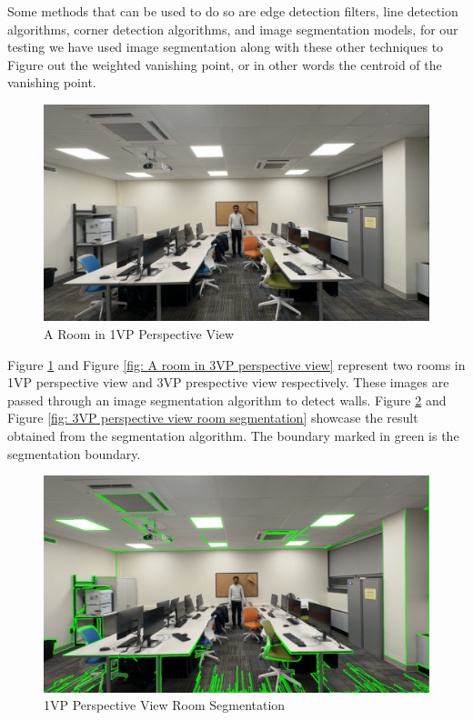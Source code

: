 \documentclass[12pt]{report}
\begin{document}
Some methods that can be used to do so are edge detection filters, line detection algorithms, corner detection algorithms, and image segmentation models, for our testing we have used image segmentation along with these other techniques to Figure out the weighted vanishing point, or in other words the centroid of the vanishing point.\newline

\begin{figure}[H]
    \centering
    \includegraphics[width=1.0\textwidth]{1vp room.jpg}
    \caption{A Room in 1VP Perspective View}
    \label{fig: A room in 1VP perspective view}
\end{figure}


Figure \ref{fig: A room in 1VP perspective view} and Figure \ref{fig: A room in 3VP perspective view} represent two rooms in 1VP perspective view and 3VP prespective view respectively. These images are passed through an image segmentation algorithm to detect walls. Figure \ref{fig: 1VP perspective view room segmentation} and Figure \ref{fig: 3VP perspective view room segmentation}  showcase the result obtained from the segmentation algorithm. The boundary marked in green is the segmentation boundary.\newline

\begin{figure}[H]
    \centering
    \includegraphics[width=1.0\textwidth]{1vp Segmentation Result.png}
    \caption{1VP Perspective View Room Segmentation}
    \label{fig: 1VP perspective view room segmentation}
\end{figure}
\end{document}
